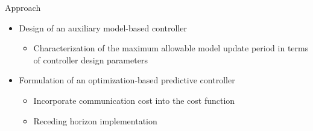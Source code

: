\documentclass[compress,9pt,xcolor=svgnames]{beamer}
\begin{document}
{\begin{block}{Approach}
        \begin{itemize}
            \item Design of an auxiliary model-based controller %
            \begin{itemize}
                \item Characterization of the maximum allowable model update period in terms of controller design parameters\vspace{1mm}
            \end{itemize}
            \item Formulation of an optimization-based predictive controller%
            \begin{itemize}
                \item Incorporate communication cost into the cost function%
                \item Receding horizon implementation
            \end{itemize}
        \end{itemize}
        \vspace{0.5mm}
    \end{block}
}
\end{document}
